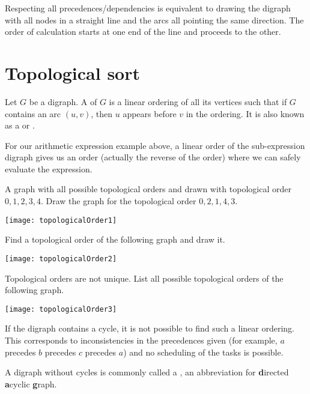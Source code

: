 Respecting all precedences/dependencies is equivalent to drawing the digraph 
with all nodes in a straight line and the arcs all pointing the same direction. 
The order of calculation starts at one end of the line and proceeds to the other.

\section{Topological sort}
\begin{Definition}
Let $G$ be a digraph. A  of $G$ is a linear
ordering of all its vertices such that if $G$ contains an arc $(u,v)$,
then $u$ appears before $v$ in the ordering. 
It is also known as a  or .
\end{Definition}

For our arithmetic expression example above, a linear
order of the sub-expression digraph gives us an order (actually the reverse
of the order) where we can safely evaluate the expression.

\begin{Boxample}[0]
\label{ex:topoorders}
A graph with all possible topological orders and drawn with topological order $0, 1, 2, 3, 4$.  
Draw the graph for the topological order $0, 2, 1, 4, 3$. 
\begin{center}
\texttt{[image: topologicalOrder1]}
\end{center}
Find a topological order of the following graph and draw it.
\begin{center}
\texttt{[image: topologicalOrder2]}
\end{center}
Topological orders are not unique. List all possible topological orders of the following graph.
\begin{center}
\texttt{[image: topologicalOrder3]}
\end{center}
\end{Boxample}

If the digraph contains a cycle, it is not possible to find
such a linear ordering. This corresponds to inconsistencies in the
precedences given (for example, $a$ precedes $b$ precedes $c$ precedes $a$) and no scheduling of the tasks is possible.

\begin{Definition}
A digraph without cycles is commonly called a , an
abbreviation for \textbf{d}irected \textbf{a}cyclic \textbf{g}raph.  
\end{Definition}

